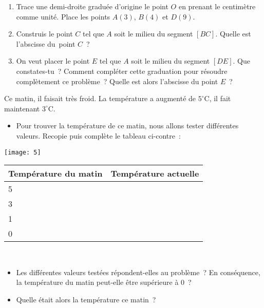 \begin{activite}

\begin{partie}
 \begin{enumerate}
  \item Trace une demi-droite graduée d'origine le point $O$ en prenant le centimètre comme unité. Place les points $A(3)$, $B(4)$ et $D(9)$.
  \item Construis le point $C$ tel que $A$ soit le milieu du segment $[BC]$. Quelle est l'abscisse du point $C$ ?
  \item On veut placer le point $E$ tel que $A$ soit le milieu du segment $[DE]$. Que constates-tu ? Comment compléter cette graduation pour résoudre complètement ce problème ? Quelle est alors l'abscisse du point $E$ ?
  \end{enumerate}
\end{partie}

\begin{partie}
 \begin{minipage}[t]{0.40\linewidth}
Ce matin, il faisait très froid. La température a augmenté de \textcolor{H1}{$5^\circ$C}, il fait maintenant $3^\circ$C.
 \begin{itemize}
  \item Pour trouver la température de ce matin, nous allons tester différentes valeurs. Recopie puis complète le tableau ci-contre :
  \end{itemize}
  \end{minipage} \hfill%
  \begin{minipage}[t]{0.56\linewidth}
  \centering
  \texttt{[image: 5]}
  
  \begin{tabularx}{0.8\linewidth}{|X|X|}
   \hline
   \rowcolor{J2} Température du matin & Température actuelle \\\hline
   \rowcolor{J2} 5 & \\\hline
   \rowcolor{J2} 3 & \\\hline
   \rowcolor{J2} 1 & \\\hline
   \rowcolor{J2} 0 & \\\hline
   \end{tabularx}
   \end{minipage} \\
   
  \begin{itemize}
  \item Les différentes valeurs testées répondent-elles au problème ? En conséquence, la température du matin peut-elle être supérieure à 0 ?
  \item Quelle était alors la température ce matin ?
  \end{itemize}
\end{partie}


\end{activite}
